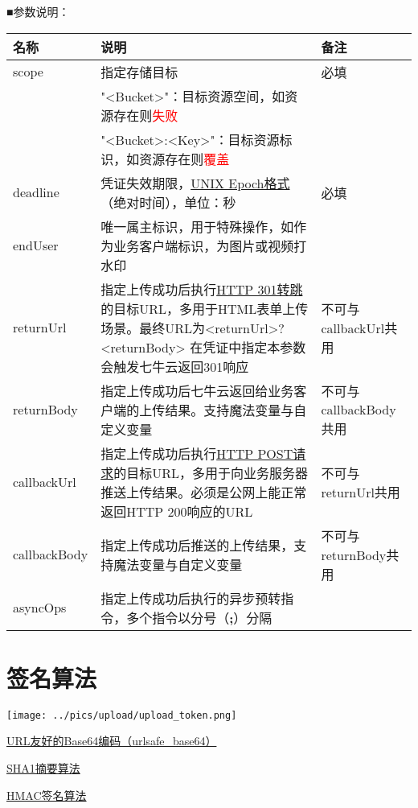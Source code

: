 \documentclass[11pt, oneside]{book}
\newcommand{\qpara}[1]{
\vspace{0.4em}
\begin{spacing}{1.35}
\noindent
#1\par
\end{spacing}
\vspace{0.4em}
}
\newcommand{\qtable}[1]{\footnotesize\vspace{0.5em}#1\vspace{0.5em}\normalsize}
\begin{document}
\clearpage

\qpara{■\thinspace 参数说明：}
\qtable{
\def\arraystretch{2}
\begin{tabular}{|l|p{25em}|p{8em}|}
\hline
名称 & 说明 & 备注 \\
\hline
scope & 指定存储目标 & 必填 \\
\cline{2-2}
      & "<Bucket>"：目标资源空间，如资源存在则\textcolor{red}{失败} & \\
\cline{2-2}
      & "<Bucket>:<Key>"：目标资源标识，如资源存在则\textcolor{red}{覆盖} & \\
\hline
deadline & 凭证失效期限，\href{http://en.wikipedia.org/wiki/Unix_time}{UNIX Epoch格式}（绝对时间），单位：秒 & 必填 \\
\hline
endUser & 唯一属主标识，用于特殊操作，如作为业务客户端标识，为图片或视频打水印 & \\
\hline
returnUrl & 指定上传成功后执行\href{http://en.wikipedia.org/wiki/HTTP_301}{HTTP 301转跳}的目标URL，多用于HTML表单上传场景。最终URL为<returnUrl>?<returnBody> \newline 在凭证中指定本参数会触发七牛云返回301响应 & 不可与callbackUrl共用 \\
\hline
returnBody & 指定上传成功后七牛云返回给业务客户端的上传结果。支持魔法变量与自定义变量 & 不可与callbackBody共用 \\
\hline
callbackUrl & 指定上传成功后执行\href{http://en.wikipedia.org/wiki/POST_(HTTP)}{HTTP POST请求}的目标URL，多用于向业务服务器推送上传结果。必须是公网上能正常返回HTTP 200响应的URL & 不可与returnUrl共用 \\
\hline
callbackBody & 指定上传成功后推送的上传结果，支持魔法变量与自定义变量 & 不可与returnBody共用 \\
\hline
asyncOps & 指定上传成功后执行的异步预转指令，多个指令以分号（{\bf ;}）分隔 & \\
\hline
\end{tabular}
}

\section{签名算法}

\begin{center}
\texttt{[image: ../pics/upload/upload\_token.png]}
\end{center}

\href{http://zh.wikipedia.org/wiki/Base64#.E5.9C.A8URL.E4.B8.AD.E7.9A.84.E5.BA.94.E7.94.A8}{URL友好的Base64编码（urlsafe\_base64）}\par
\href{http://en.wikipedia.org/wiki/SHA-1}{SHA1摘要算法}\par
\href{http://en.wikipedia.org/wiki/Hash-based_message_authentication_code}{HMAC签名算法}\par
\end{document}
